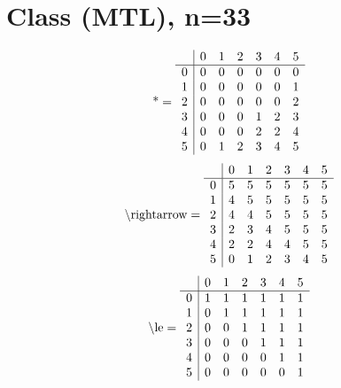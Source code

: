 \documentclass[11pt]{article}
\begin{document}
\section{Class (MTL), n=33}
\[\text{*} = 
\begin{array}{r | r r r r r r}
 & 0 & 1 & 2 & 3 & 4 & 5 \\ \hline
0 & 0 & 0 & 0 & 0 & 0 & 0 \\
1 & 0 & 0 & 0 & 0 & 0 & 1 \\
2 & 0 & 0 & 0 & 0 & 0 & 2 \\
3 & 0 & 0 & 0 & 1 & 2 & 3 \\
4 & 0 & 0 & 0 & 2 & 2 & 4 \\
5 & 0 & 1 & 2 & 3 & 4 & 5 \\
\end{array}
\]
\[\text{\textbackslash rightarrow} = 
\begin{array}{r | r r r r r r}
 & 0 & 1 & 2 & 3 & 4 & 5 \\ \hline
0 & 5 & 5 & 5 & 5 & 5 & 5 \\
1 & 4 & 5 & 5 & 5 & 5 & 5 \\
2 & 4 & 4 & 5 & 5 & 5 & 5 \\
3 & 2 & 3 & 4 & 5 & 5 & 5 \\
4 & 2 & 2 & 4 & 4 & 5 & 5 \\
5 & 0 & 1 & 2 & 3 & 4 & 5 \\
\end{array}
\]
\[\text{\textbackslash le} = 
\begin{array}{r | r r r r r r}
 & 0 & 1 & 2 & 3 & 4 & 5 \\ \hline
0 & 1 & 1 & 1 & 1 & 1 & 1 \\
1 & 0 & 1 & 1 & 1 & 1 & 1 \\
2 & 0 & 0 & 1 & 1 & 1 & 1 \\
3 & 0 & 0 & 0 & 1 & 1 & 1 \\
4 & 0 & 0 & 0 & 0 & 1 & 1 \\
5 & 0 & 0 & 0 & 0 & 0 & 1 \\
\end{array}
\]
\end{document}
